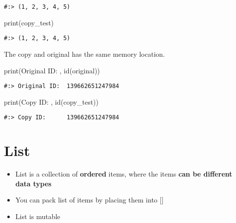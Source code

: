 \documentclass[
]{book}
\newenvironment{Shaded}{\begin{snugshade}}{\end{snugshade}}
\newcommand{\BuiltInTok}[1]{#1}
\newcommand{\NormalTok}[1]{#1}
\newcommand{\StringTok}[1]{\textcolor[rgb]{0.5,0.5,0.5}{#1}}
\providecommand{\tightlist}{%
  \setlength{\itemsep}{0pt}\setlength{\parskip}{0pt}}
\begin{document}
\begin{verbatim}
#:> (1, 2, 3, 4, 5)
\end{verbatim}

\begin{Shaded}
\begin{Highlighting}[]
\BuiltInTok{print}\NormalTok{(copy\_test)}
\end{Highlighting}
\end{Shaded}

\begin{verbatim}
#:> (1, 2, 3, 4, 5)
\end{verbatim}

The copy and original has the same memory location.

\begin{Shaded}
\begin{Highlighting}[]
\BuiltInTok{print}\NormalTok{(}\StringTok{\textquotesingle{}Original ID: \textquotesingle{}}\NormalTok{, }\BuiltInTok{id}\NormalTok{(original))}
\end{Highlighting}
\end{Shaded}

\begin{verbatim}
#:> Original ID:  139662651247984
\end{verbatim}

\begin{Shaded}
\begin{Highlighting}[]
\BuiltInTok{print}\NormalTok{(}\StringTok{\textquotesingle{}Copy ID:     \textquotesingle{}}\NormalTok{, }\BuiltInTok{id}\NormalTok{(copy\_test))}
\end{Highlighting}
\end{Shaded}

\begin{verbatim}
#:> Copy ID:      139662651247984
\end{verbatim}

\hypertarget{list}{%
\section{List}\label{list}}

\begin{itemize}
\tightlist
\item
  List is a collection of \textbf{ordered} items, where the items \textbf{can be different data types}\\
\item
  You can pack list of items by placing them into {[}{]}\\
\item
  List is mutable
\end{itemize}
\end{document}
